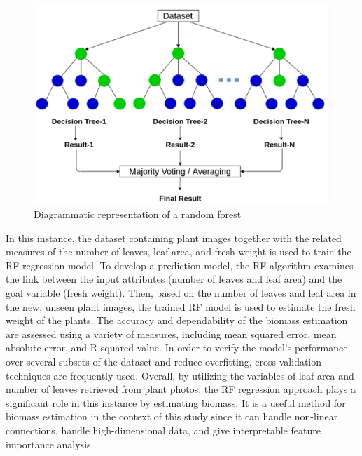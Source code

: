 \documentclass[a4paper,12pt]{report}%
\renewcommand{\\}{\vspace*{0.5\baselineskip} \newline}
\begin{document}
\begin{figure}[h]
\centering
	\includegraphics[scale=0.95]{images/random forest regression.png}\\
	\begin{footnotesize}
		\caption{Diagrammatic representation of a random forest \cite{27}}
		\label{Diagrammatic representation of a random forest}
	\end{footnotesize}
\end{figure}

\noindent In this instance, the dataset containing plant images together with the related measures of the number of leaves, leaf area, and fresh weight is used to train the RF regression model. To develop a prediction model, the RF algorithm examines the link between the input attributes (number of leaves and leaf area) and the goal variable (fresh weight). Then, based on the number of leaves and leaf area in the new, unseen plant images, the trained RF model is used to estimate the fresh weight of the plants.
The accuracy and dependability of the biomass estimation are assessed using a variety of measures, including mean squared error, mean absolute error, and R-squared value. In order to verify the model's performance over several subsets of the dataset and reduce overfitting, cross-validation techniques are frequently used.
Overall, by utilizing the variables of leaf area and number of leaves retrieved from plant photos, the RF regression approach plays a significant role in this instance by estimating biomass. It is a useful method for biomass estimation in the context of this study since it can handle non-linear connections, handle high-dimensional data, and give interpretable feature importance analysis.
\end{document}
